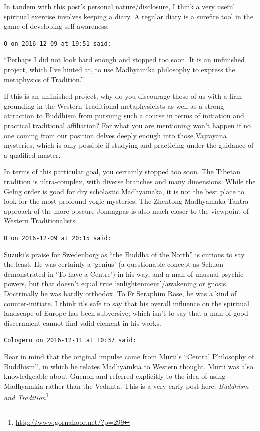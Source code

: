 \begin{footnotesize}
\begin{sffamily}
In tandem with this post's personal nature/disclosure, I think a very useful spiritual exercise involves keeping a diary. A regular diary is a surefire tool in the game of developing self-awareness.

\hfill

\texttt{O on 2016-12-09 at 19:51 said:}

``Perhaps I did not look hard enough and stopped too soon. It is an unfinished project, which I've hinted at, to use Madhyamika philosophy to express the metaphysics of Tradition.''

If this is an unfinished project, why do you discourage those of us with a firm grounding in the Western Traditional metaphysicists as well as a strong attraction to Buddhism from pursuing such a course in terms of initiation and practical traditional affiliation? For what you are mentioning won't happen if no one coming from our position delves deeply enough into those Vajrayana mysteries, which is only possible if studying and practicing under the guidance of a qualified master.

In terms of this particular goal, you certainly stopped too soon. The Tibetan tradition is ultra-complex, with diverse branches and many dimensions. While the Gelug order is good for dry scholastic Madhyamaka, it is not the best place to look for the most profound yogic mysteries. The Zhentong Madhyamaka Tantra approach of the more obscure Jonangpas is also much closer to the viewpoint of Western Traditionalists.

\hfill

\texttt{O on 2016-12-09 at 20:15 said:}

Suzuki's praise for Swedenborg as ``the Buddha of the North'' is curious to say the least. He was certainly a `genius' (a questionable concept as Schuon demonstrated in `To have a Centre') in his way, and a man of unusual psychic powers, but that doesn't equal true `enlightenment'/awakening or gnosis. Doctrinally he was hardly orthodox. To Fr Seraphim Rose, he was a kind of counter-initiate. I think it's safe to say that his overall influence on the spiritual landscape of Europe has been subversive; which isn't to say that a man of good discernment cannot find valid element in his works.

\hfill

\texttt{Cologero on 2016-12-11 at 10:37 said:}

Bear in mind that the original impulse came from Murti's ``Central Philosophy of Buddhism'', in which he relates Madhyamkia to Western thought. Murti was also knowledgeable about Guenon and referred explicitly to the idea of using Madhyamkia rather than the Vedanta. This is a very early post here:
\textit{Buddhism and Tradition}\footnote{\url{http://www.gornahoor.net/?p=299}}



\end{sffamily}
\end{footnotesize}
